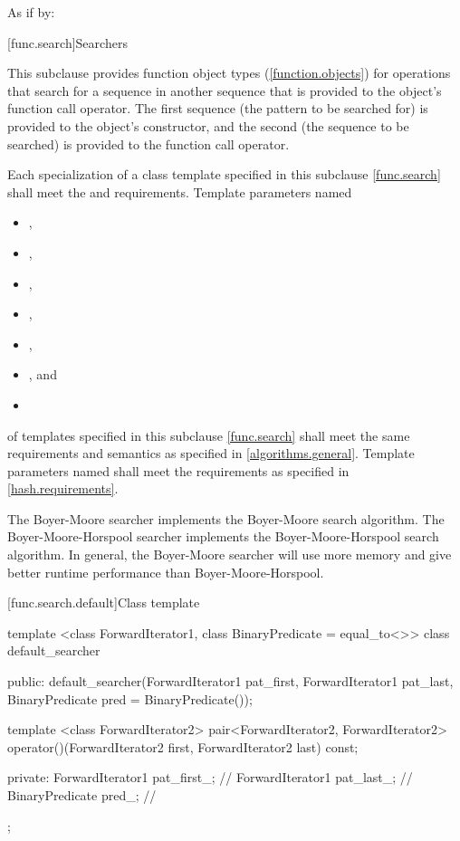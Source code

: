 \begin{itemdescr}
\pnum\effects As if by: 
\end{itemdescr}%

[func.search]{Searchers}

\pnum
This subclause provides function object types (\ref{function.objects}) for
operations that search for a sequence  in another
sequence  that is provided to the object's function call
operator.  The first sequence (the pattern to be searched for) is provided to
the object's constructor, and the second (the sequence to be searched) is
provided to the function call operator.

\pnum
Each specialization of a class template specified in this subclause \ref{func.search} shall meet the  and  requirements.
Template parameters named
\begin{itemize}
\item {},
\item {},
\item {},
\item {},
\item {},
\item {}, and
\item {}
\end{itemize}
of templates specified in this subclause
\ref{func.search} shall meet the same requirements and semantics as
specified in \ref{algorithms.general}.
Template parameters named  shall meet the requirements as specified in \ref{hash.requirements}.

\pnum
The Boyer-Moore searcher implements the Boyer-Moore search algorithm.
The Boyer-Moore-Horspool searcher implements the Boyer-Moore-Horspool search algorithm.
In general, the Boyer-Moore searcher will use more memory and give better runtime performance than Boyer-Moore-Horspool.

[func.search.default]{Class template }

%
\begin{codeblock}
template <class ForwardIterator1, class BinaryPredicate = equal_to<>>
  class default_searcher {
  public:
    default_searcher(ForwardIterator1 pat_first, ForwardIterator1 pat_last,
                     BinaryPredicate pred = BinaryPredicate());

    template <class ForwardIterator2>
      pair<ForwardIterator2, ForwardIterator2>
        operator()(ForwardIterator2 first, ForwardIterator2 last) const;

  private:
    ForwardIterator1 pat_first_;        // \expos
    ForwardIterator1 pat_last_;         // \expos
    BinaryPredicate pred_;              // \expos
  };
\end{codeblock}

